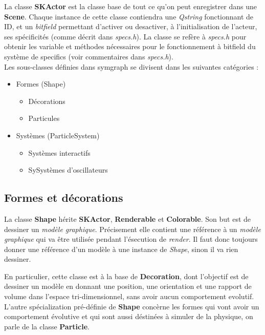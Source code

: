 \documentclass{report}
\begin{document}
La classe \textbf{SKActor} est la classe base de tout ce qu'on peut 
enregistrer dans une \textbf{Scene}. 
Chaque instance de cette classe contiendra une \textit{Qstring} fonctionnant de ID, et un \textit{bitfield} permettant d'activer ou desactiver,
à l'initialisation de l'acteur, ses spécificités (comme décrit dans \textit{specs.h}). 
La classe se refère à \textit{specs.h} pour obtenir les variable et méthodes nécessaires pour le fonctionnement à bitfield du système de specifics (voir commentaires dans \textit{specs.h}).
\\
Les sous-classes définies dans symgraph se divisent dans les suivantes catégories :
\begin{itemize}

\item Formes (Shape)

\begin{itemize}
\item Décorations
\item Particules
\end{itemize}

\item Systèmes (ParticleSystem)

\begin{itemize}
\item Systèmes interactifs
\item SySystèmes d'oscillateurs
\end{itemize}

\end{itemize}

\subsection{Formes et décorations}

La classe \textbf{Shape} hérite \textbf{SKActor}, \textbf{Renderable} et 
\textbf{Colorable}. Son but est de dessiner un \textit{modèle graphique}.
Précisement elle contient une référence à un \textit{modèle graphique} 
qui va être utilisée pendant l'ésecution de \textit{render}.
Il faut donc toujours donner une référence d'un modèle à une instance de
\textit{Shape}, sinon il va rien dessiner.


En particulier, cette classe est à la base de \textbf{Decoration}, 
dont l'objectif est de dessiner un modèle en donnant une position,
une orientation et une rapport de volume dans l'espace tri-dimensionnel, 
sans avoir aucun comportement evolutif.
L'autre spécialization pré-définie de \textbf{Shape} concèrne les
formes qui vont avoir un comportement évolutive et qui sont aussi
déstinées à simuler de la physique, on parle de la classe \textbf{Particle}.
\end{document}
